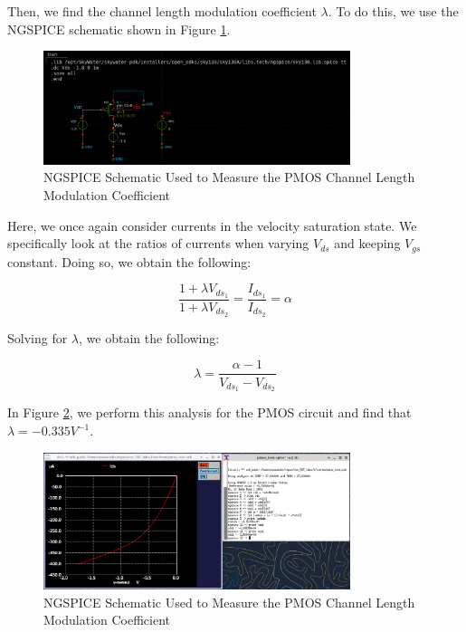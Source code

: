 \documentclass{article}
\begin{document}
	Then, we find the channel length modulation coefficient $\lambda$. To do this, we use the NGSPICE schematic shown in Figure \ref{fig::pmos_lambda_meas_schem}.
	
	\begin{figure}[H]
		\centerline{\includegraphics[width=0.8\textwidth]{pmos_lambda_meas_schem.png}}
		\caption{NGSPICE Schematic Used to Measure the PMOS Channel Length Modulation Coefficient}
		\label{fig::pmos_lambda_meas_schem}
	\end{figure}
	
	\noindent Here, we once again consider currents in the velocity saturation state. We specifically look at the ratios of currents when varying $V_{ds}$ and keeping $V_{gs}$ constant. Doing so, we obtain the following:
	
	\begin{equation}
		\frac{1 + {\lambda}V_{ds_1}}{1 + {\lambda}V_{ds_2}} = \frac{I_{ds_1}}{I_{ds_2}} = \alpha
	\end{equation}
	
	\noindent Solving for $\lambda$, we obtain the following:
	
	\begin{equation}
		\lambda = \frac{\alpha - 1}{V_{ds_1} - V_{ds_2}}
	\end{equation}
	
	\noindent In Figure \ref{fig::pmos_lambda_meas}, we perform this analysis for the PMOS circuit and find that $\lambda = -0.335 V^{-1}$.
	
	\begin{figure}[H]
		\centerline{\includegraphics[width=0.8\textwidth]{pmos_lambda_meas.png}}
		\caption{NGSPICE Schematic Used to Measure the PMOS Channel Length Modulation Coefficient}
		\label{fig::pmos_lambda_meas}
	\end{figure}
	
\end{document}
